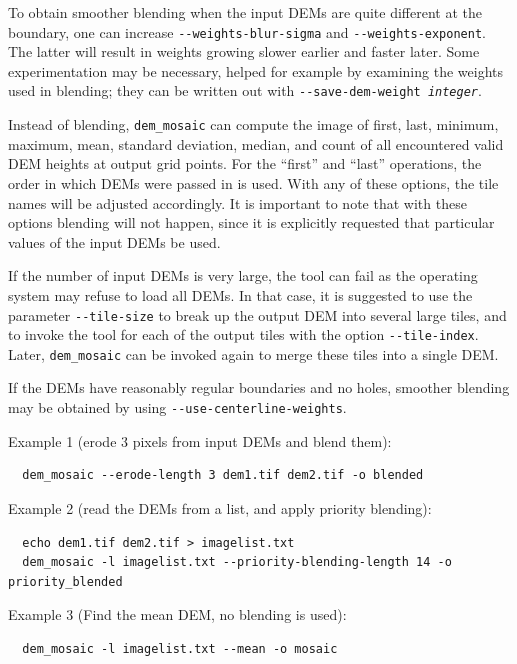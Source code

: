 To obtain smoother blending when the input DEMs are quite different at
the boundary, one can increase \texttt{-\/-weights-blur-sigma} and
\texttt{-\/-weights-exponent}. The latter will result in weights growing
slower earlier and faster later. Some experimentation may be necessary,
helped for example by examining the weights used in blending; they can be
written out with \texttt{-\/-save-dem-weight \textit{integer}}.

Instead of blending, \texttt{dem\_mosaic} can compute the image of
first, last, minimum, maximum, mean, standard deviation, median, and
count of all encountered valid \ac{DEM} heights at output grid
points. For the ``first'' and ``last'' operations, the order in which
\acp{DEM} were passed in is used. With any of these options, the tile
names will be adjusted accordingly. It is important to note that with
these options blending will not happen, since it is explicitly
requested that particular values of the input DEMs be used.

If the number of input DEMs is very large, the tool can fail as the operating
system may refuse to load all DEMs. In that case, it is suggested to use
the parameter \texttt{-\/-tile-size} to break up the output DEM into
several large tiles, and to invoke the tool for each of the output tiles
with the option \texttt{-\/-tile-index}. Later, \texttt{dem\_mosaic} can be
invoked again to merge these tiles into a single DEM.

If the DEMs have reasonably regular boundaries and no holes, smoother 
blending may be obtained by using \texttt{-\/-use-centerline-weights}.

Example 1 (erode 3 pixels from input DEMs and blend them):
\begin{verbatim}
  dem_mosaic --erode-length 3 dem1.tif dem2.tif -o blended
\end{verbatim}

Example 2 (read the DEMs from a list, and apply priority blending):
\begin{verbatim}
  echo dem1.tif dem2.tif > imagelist.txt
  dem_mosaic -l imagelist.txt --priority-blending-length 14 -o priority_blended
\end{verbatim}

Example 3 (Find the mean DEM, no blending is used):
\begin{verbatim}
  dem_mosaic -l imagelist.txt --mean -o mosaic
\end{verbatim}

